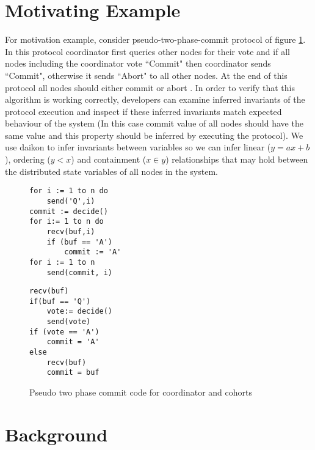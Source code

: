 \section{Motivating Example}
For motivation example, consider pseudo-two-phase-commit protocol of figure \ref{lst:2pc}. In this protocol coordinator first queries other nodes for their vote and if all nodes including the coordinator vote ``Commit" then coordinator sends ``Commit", otherwise it sends ``Abort" to all other nodes. At the end of this protocol all nodes should either commit or abort . In order to verify that this algorithm is working correctly, developers can examine inferred invariants of the protocol execution and inspect if these inferred invariants match expected behaviour of the system (In this case commit value of all nodes should have the same value and this property should be inferred by executing the protocol). We use daikon \cite{ernst2001dynamically} to infer invariants between variables so we can infer linear ($y = ax + b$), ordering ($y < x$) and containment ($x \in y$) relationships that may hold between the distributed state variables of all nodes in the system.


\begin{figure}
\centering
\begin{lstlisting}[caption={Coordinator Code}]
for i := 1 to n do
	send('Q',i)
commit := decide()
for i:= 1 to n do
	recv(buf,i)
	if (buf == 'A')
		commit := 'A'
for i := 1 to n
	send(commit, i)
\end{lstlisting}
\begin{lstlisting}[caption={Coordinator Code}]
recv(buf)
if(buf == 'Q')
	vote:= decide()
	send(vote)
if (vote == 'A')
	commit = 'A'
else
	recv(buf)
	commit = buf
\end{lstlisting}
\caption{Pseudo two phase commit code for coordinator and cohorts}
\label{lst:2pc}
\end{figure}

\section{Background}


